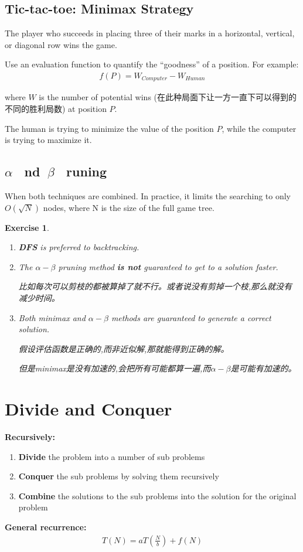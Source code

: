 \documentclass{article}
\newtheorem*{Exercise}{Exercise}
\begin{document}
\subsection{Tic-tac-toe:  Minimax Strategy}
The player who succeeds in placing three of their marks in a horizontal, vertical, or diagonal row wins the game.

Use an evaluation function to quantify the ``goodness'' of a position.  For example:
\begin{align*}
    f(P)=W_{Computer}-W_{Human}
\end{align*}\par
where $W$ is the number of potential wins (在此种局面下让一方一直下可以得到的不同的胜利局数) at position $P$.

The human is trying to minimize the value of the position $P$, while the computer is trying to maximize it.

\subsection{\texorpdfstring{$\alpha$ \ }  and \texorpdfstring{$\ \beta$ \ } pruning}
When both techniques are combined.  In practice, it limits the searching to only $O(\sqrt{N})$ nodes, where N is the size of the full game tree.

\begin{Exercise}
    \par
    \begin{enumerate}
        \item \textbf{DFS} is preferred to backtracking.
        \item The $\alpha - \beta$ pruning method \textbf{is not} guaranteed to get to a solution faster.\par
        比如每次可以剪枝的都被算掉了就不行。或者说没有剪掉一个枝,那么就没有减少时间。
        \item Both minimax and $\alpha - \beta$ methods are guaranteed to generate a correct solution.\par
        假设评估函数是正确的,而非近似解,那就能得到正确的解。\par
        但是minimax是没有加速的,会把所有可能都算一遍,而$\alpha - \beta$是可能有加速的。
    \end{enumerate}
\end{Exercise}

\newpage
\section{Divide and Conquer}
\textbf{Recursively:}
\begin{enumerate}
    \item \textbf{Divide} the problem into a number of sub problems
    \item \textbf{Conquer} the sub problems by solving them recursively
    \item \textbf{Combine} the solutions to the sub problems into the solution for the original problem
\end{enumerate}
\textbf{General recurrence: }
\begin{align*}
    T(N)=aT(\frac{N}{b})+f(N)
\end{align*}
\end{document}

